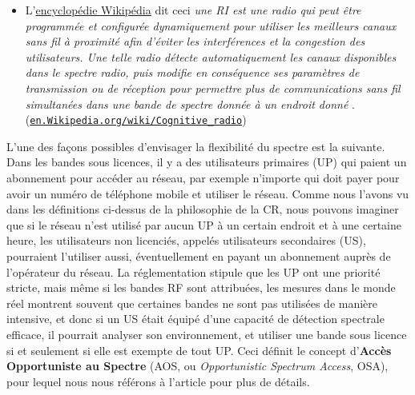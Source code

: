 \begin{resume_fr}
\begin{itemize}
    \item
    L'\href{https://en.wikipedia.org/wiki/Cognitive_radio}{encyclopédie Wikipédia} dit ceci
    \guillemotleft{} \emph{une RI est une radio qui peut être programmée et configurée dynamiquement pour utiliser les meilleurs canaux sans fil à proximité afin d'éviter les interférences et la congestion des utilisateurs. Une telle radio détecte automatiquement les canaux disponibles dans le spectre radio, puis modifie en conséquence ses paramètres de transmission ou de réception pour permettre plus de communications sans fil simultanées dans une bande de spectre donnée à un endroit donné} \guillemotright{}.
    (\href{https://en.wikipedia.org/wiki/Cognitive_radio}{\texttt{en.Wikipedia.org/wiki/Cognitive\_radio}})
\end{itemize}

L'une des façons possibles d'envisager la flexibilité du spectre est la suivante.
%
Dans les bandes sous licences, il y a des utilisateurs primaires (UP) qui paient un abonnement pour accéder au réseau, par exemple n'importe qui doit payer pour avoir un numéro de téléphone mobile et utiliser le réseau.
Comme nous l'avons vu dans les définitions ci-dessus de la philosophie de la CR, nous pouvons imaginer que si le réseau n'est utilisé par aucun UP à un certain endroit et à une certaine heure, les utilisateurs non licenciés, appelés utilisateurs secondaires (US), pourraient l'utiliser aussi, éventuellement en payant un abonnement auprès de l'opérateur du réseau.
%
La réglementation stipule que les UP ont une priorité stricte,
mais même si les bandes RF sont attribuées, les mesures dans le monde réel montrent souvent que certaines bandes ne sont pas utilisées de manière intensive, et donc si un US était équipé d'une capacité de détection spectrale efficace, il pourrait analyser son environnement, et utiliser une bande sous licence si et seulement si elle est exempte de tout UP.
Ceci définit le concept d'\textbf{Accès Opportuniste au Spectre} (AOS, ou \emph{Opportunistic Spectrum Access}, OSA), pour lequel nous nous référons à l'article \cite{Zhao07} pour plus de détails.



\end{resume_fr}
